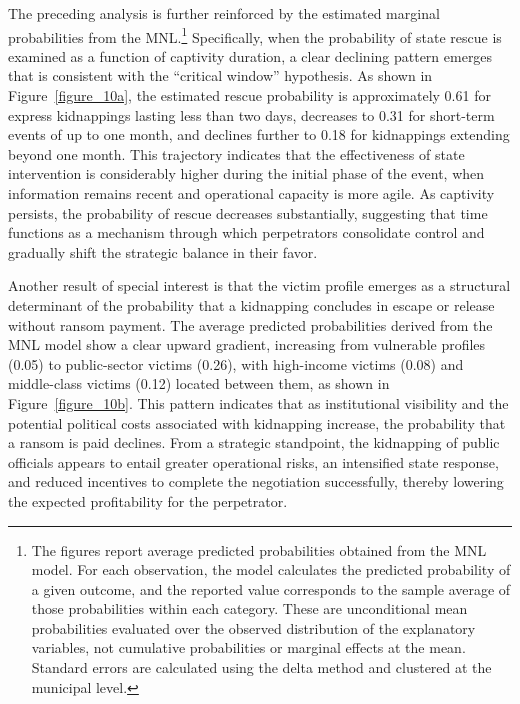 \documentclass[12pt,a4paper]{article}
\theoremstyle{plain}
\theoremstyle{definition}
\theoremstyle{remark}
\newcommand{\1}{\mathbf{1}}
\begin{document}
The preceding analysis is further reinforced by the estimated marginal probabilities from the MNL.\footnote{The figures report average predicted probabilities obtained from the MNL model. For each observation, the model calculates the predicted probability of a given outcome, and the reported value corresponds to the sample average of those probabilities within each category. These are unconditional mean probabilities evaluated over the observed distribution of the explanatory variables, not cumulative probabilities or marginal effects at the mean. Standard errors are calculated using the delta method and clustered at the municipal level.} Specifically, when the probability of state rescue is examined as a function of captivity duration, a clear declining pattern emerges that is consistent with the ``critical window'' hypothesis. As shown in Figure~\ref{figure_10a}, the estimated rescue probability is approximately 0.61 for express kidnappings lasting less than two days, decreases to 0.31 for short-term events of up to one month, and declines further to 0.18 for kidnappings extending beyond one month. This trajectory indicates that the effectiveness of state intervention is considerably higher during the initial phase of the event, when information remains recent and operational capacity is more agile. As captivity persists, the probability of rescue decreases substantially, suggesting that time functions as a mechanism through which perpetrators consolidate control and gradually shift the strategic balance in their favor.

Another result of special interest is that the victim profile emerges as a structural determinant of the probability that a kidnapping concludes in escape or release without ransom payment. The average predicted probabilities derived from the MNL model show a clear upward gradient, increasing from vulnerable profiles (0.05) to public-sector victims (0.26), with high-income victims (0.08) and middle-class victims (0.12) located between them, as shown in Figure~\ref{figure_10b}. This pattern indicates that as institutional visibility and the potential political costs associated with kidnapping increase, the probability that a ransom is paid declines. From a strategic standpoint, the kidnapping of public officials appears to entail greater operational risks, an intensified state response, and reduced incentives to complete the negotiation successfully, thereby lowering the expected profitability for the perpetrator.
\end{document}
